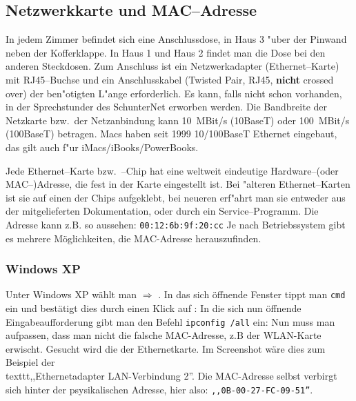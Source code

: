 
\subsection{Netzwerkkarte und MAC--Adresse}
\label{sec:netzw-und-mac}
In jedem Zimmer befindet sich eine Anschlussdose, in Haus 3 "uber der Pinwand
neben der Kofferklappe. In Haus 1 und Haus 2 findet man die Dose bei
den anderen Steckdosen. 
\rm Zum Anschluss ist ein Netzwerkadapter (Ethernet--Karte) mit RJ45--Buch\-se und
ein Anschlusskabel (Twisted Pair, RJ45, \textbf{nicht} crossed over) der
ben"otigten L"ange erforderlich. Es  kann, falls nicht schon
vorhanden, in der \glossar Sprechstunder des SchunterNet erworben werden.
Die Bandbreite der Netzkarte bzw.\  der Netzanbindung kann 10~MBit/s (10BaseT) oder 100~MBit/s (100BaseT) betragen. Macs haben seit 1999 10/100BaseT Ethernet eingebaut, das gilt auch
f"ur iMacs/iBooks/PowerBooks.

Jede Ethernet--Karte bzw.\ --Chip hat eine weltweit eindeutige Hardware--(oder
\glossar MAC--)Adresse, die fest in der Karte eingestellt ist. Bei "alteren
Ethernet--Karten ist sie auf einen der Chips aufgeklebt, bei neueren
erf"ahrt man sie entweder aus der mitgelieferten Dokumentation, oder
durch ein Service--Programm.%
Die Adresse kann z.B. so aussehen: \texttt{00:12:6b:9f:20:cc}
Je nach Betriebssystem gibt es mehrere Möglichkeiten, die MAC-Adresse
herauszufinden.
\newpage
\subsubsection*{Windows XP}

Unter Windows XP wählt man  $\Rightarrow$
.  In das sich öffnende Fenster tippt man  \texttt{cmd}
ein und bestätigt dies durch einen Klick auf :
 In die sich
nun öffnende Eingabeaufforderung gibt man den Befehl \texttt{ipconfig /all}
ein: %
Nun muss man aufpassen, dass man nicht die falsche MAC-Adresse, z.B
der WLAN-Karte erwischt. Gesucht wird die der Ethernetkarte. Im
Screenshot wäre dies zum Beispiel der \\texttt{,,Ethernetadapter LAN-Verbindung
2''}. Die MAC-Adresse selbst verbirgt sich hinter der psysikalischen
Adresse, hier also: \texttt{,,0B-00-27-FC-09-51''}.
